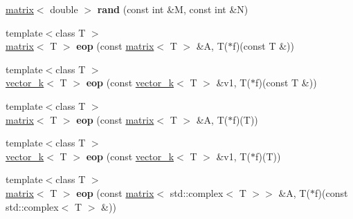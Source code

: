 \begin{DoxyCompactItemize}
\item 
\hypertarget{namespacekeycpp_ae5c4b142a4101e9bb1df9f19efaf7d2f}{\hyperlink{classkeycpp_1_1matrix}{matrix}$<$ double $>$ {\bfseries rand} (const int \&M, const int \&N)}\label{namespacekeycpp_ae5c4b142a4101e9bb1df9f19efaf7d2f}

\item 
\hypertarget{namespacekeycpp_aae90693acdaf666bd23bf861f2c0d28c}{{\footnotesize template$<$class T $>$ }\\\hyperlink{classkeycpp_1_1matrix}{matrix}$<$ T $>$ {\bfseries eop} (const \hyperlink{classkeycpp_1_1matrix}{matrix}$<$ T $>$ \&A, T($\ast$f)(const T \&))}\label{namespacekeycpp_aae90693acdaf666bd23bf861f2c0d28c}

\item 
\hypertarget{namespacekeycpp_a6c6542964c7aaaccbee336567f64c03c}{{\footnotesize template$<$class T $>$ }\\\hyperlink{classkeycpp_1_1vector__k}{vector\-\_\-k}$<$ T $>$ {\bfseries eop} (const \hyperlink{classkeycpp_1_1vector__k}{vector\-\_\-k}$<$ T $>$ \&v1, T($\ast$f)(const T \&))}\label{namespacekeycpp_a6c6542964c7aaaccbee336567f64c03c}

\item 
\hypertarget{namespacekeycpp_a3a1ba458353cfecef659b40e446baaf0}{{\footnotesize template$<$class T $>$ }\\\hyperlink{classkeycpp_1_1matrix}{matrix}$<$ T $>$ {\bfseries eop} (const \hyperlink{classkeycpp_1_1matrix}{matrix}$<$ T $>$ \&A, T($\ast$f)(T))}\label{namespacekeycpp_a3a1ba458353cfecef659b40e446baaf0}

\item 
\hypertarget{namespacekeycpp_a48fb1c8a89210ed78554ecd0bed92a59}{{\footnotesize template$<$class T $>$ }\\\hyperlink{classkeycpp_1_1vector__k}{vector\-\_\-k}$<$ T $>$ {\bfseries eop} (const \hyperlink{classkeycpp_1_1vector__k}{vector\-\_\-k}$<$ T $>$ \&v1, T($\ast$f)(T))}\label{namespacekeycpp_a48fb1c8a89210ed78554ecd0bed92a59}

\item 
\hypertarget{namespacekeycpp_a5afc215befa38bf47fb52cff33794ebe}{{\footnotesize template$<$class T $>$ }\\\hyperlink{classkeycpp_1_1matrix}{matrix}$<$ T $>$ {\bfseries eop} (const \hyperlink{classkeycpp_1_1matrix}{matrix}$<$ std\-::complex$<$ T $>$$>$ \&A, T($\ast$f)(const std\-::complex$<$ T $>$ \&))}\label{namespacekeycpp_a5afc215befa38bf47fb52cff33794ebe}


\end{DoxyCompactItemize}
